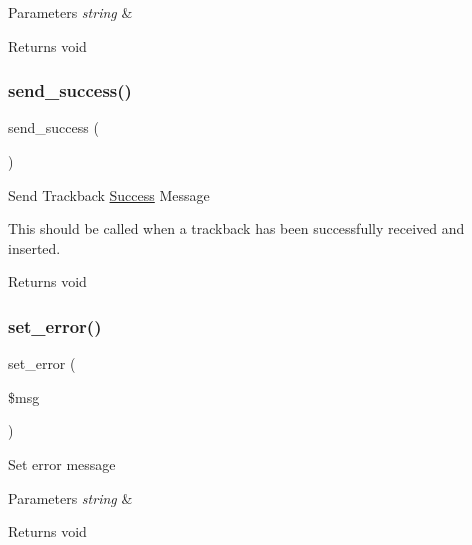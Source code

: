 \begin{DoxyParams}{Parameters}
{\em string} & \\
\hline
\end{DoxyParams}
\begin{DoxyReturn}{Returns}
void 
\end{DoxyReturn}
\mbox{\label{class_c_i___trackback_a57468453a4dc88340fdf12fb6e314248}} 
\subsubsection{\texorpdfstring{send\+\_\+success()}{send\_success()}}
{\footnotesize\ttfamily send\+\_\+success (\begin{DoxyParamCaption}{ }\end{DoxyParamCaption})}

Send Trackback \mbox{\hyperlink{class_success}{Success}} Message

This should be called when a trackback has been successfully received and inserted.

\begin{DoxyReturn}{Returns}
void 
\end{DoxyReturn}
\mbox{\label{class_c_i___trackback_a892f1ba7cba3731a3fc68f1f64e92610}} 
\subsubsection{\texorpdfstring{set\+\_\+error()}{set\_error()}}
{\footnotesize\ttfamily set\+\_\+error (\begin{DoxyParamCaption}\item[{}]{\$msg }\end{DoxyParamCaption})}

Set error message


\begin{DoxyParams}{Parameters}
{\em string} & \\
\hline
\end{DoxyParams}
\begin{DoxyReturn}{Returns}
void 
\end{DoxyReturn}
\mbox{\label{class_c_i___trackback_a5caa264fab6d2b2344e6bd5b298b08f2}} 
